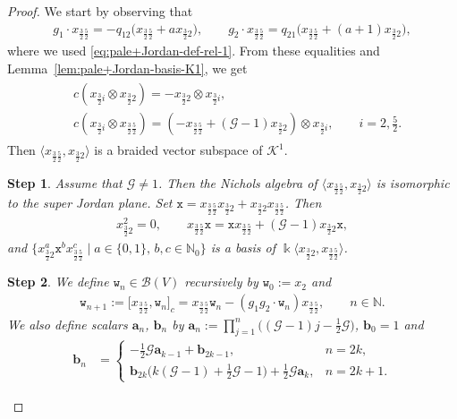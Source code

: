 \documentclass[10pt,a4paper]{amsart}
\numberwithin{equation}{section}
\newtheorem{stepiv}{Step}
\newcommand{\toba}{\mathscr B}
\newcommand{\ghost}{\mathscr{G}}
\newcommand{\K}{{\mathcal{K}}}
\newcommand{\ab}{\mathbf a}
\newcommand{\bb}{\mathbf b}
\newcommand{\N}{{\mathbb N}}
\newcommand{\wt}{\mathtt{w}}
\newcommand{\xt}{\mathtt{x}}
\newcommand{\tresdos}{\frac{3}{2}}
\newcommand{\cincodos}{\frac{5}{2}}
\begin{document}
\begin{proof} We start by observing that
\begin{align*}
g_1\cdot x_{\tresdos\cincodos} = -q_{12}\big(x_{\tresdos\cincodos}+ax_{\tresdos2}\big),\qquad
g_2\cdot x_{\tresdos\cincodos} = q_{21}\big(x_{\tresdos\cincodos}+(a+1)x_{\tresdos2}\big),
\end{align*}
where we used \eqref{eq:pale+Jordan-def-rel-1}.
From these equalities and Lemma~\ref{lem:pale+Jordan-basis-K1}, we get
\begin{align}\label{eq:pale+Jordan-g=1-subspace}
\begin{aligned}
&c(x_{\tresdos i} \otimes x_{\tresdos2}) = -x_{\tresdos2} \otimes x_{\tresdos i}, \\
&c(x_{\tresdos i} \otimes x_{\tresdos\cincodos}) = (-x_{\tresdos\cincodos}+(\ghost-1)x_{\tresdos2}) \otimes x_{\tresdos i},\qquad i = 2,\tfrac{5}{2}.
\end{aligned}
\end{align}
Then $\langle x_{\tresdos\cincodos},x_{\tresdos2}\rangle$ is a braided vector subspace of $\K^1$.

\begin{stepiv}
Assume that $\ghost \neq 1$. Then the Nichols algebra of $\big\langle x_{\tresdos\cincodos},x_{\tresdos2}\big\rangle$ is
isomorphic to the super Jordan plane. Set $\xt=x_{\tresdos\cincodos}x_{\tresdos2}+x_{\tresdos2}x_{\tresdos\cincodos}$. Then
\begin{align}\label{eq:pale+Jordan-def-rel-3}
x_{\tresdos2}^2 =0, \qquad
x_{\tresdos\cincodos}\xt = \xt x_{\tresdos\cincodos} +(\ghost-1) x_{\tresdos2}\xt,
\end{align}
and $\big\{x_{\tresdos2}^a \xt^b x_{\tresdos\cincodos}^c \mid a\in\{0,1\}, \, b,c \in\N_0\big\}$
is a basis of $\Bbbk \big\langle x_{\tresdos2}, x_{\tresdos\cincodos}\big\rangle$.
\end{stepiv}

\begin{stepiv}\label{lem:pale+Jordan-K1-action-derivations}
We define $\wt_n\in\toba(V)$ recursively by
$\wt_0 := x_2$ and
\begin{align*}
\wt_{n+1} := \big[x_{\tresdos\cincodos},\wt_n\big]_c =x_{\tresdos\cincodos}\wt_n -(g_1g_2\cdot \wt_n) x_{\tresdos\cincodos},\qquad
 n\in\N.
\end{align*}
We also define scalars $\ab_n$, $\bb_n$ by $\ab_n := \prod_{j=1}^n \big((\ghost-1)j - \frac{1}{2}\ghost\big)$, $\bb_0=1$ and
\begin{align*}
\bb_{n} &= \begin{cases}
- \frac{1}{2}\ghost\ab_{k-1} +\bb_{2k-1}, & n=2k,
\\
\bb_{2k} \big(k(\ghost-1) + \frac{1}{2}\ghost -1\big) + \frac{1}{2}\ghost\ab_k, & n=2k+1.
\end{cases}
\end{align*}


\end{stepiv}
\end{proof}
\end{document}

